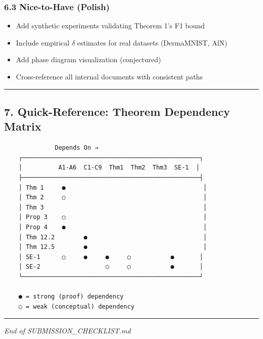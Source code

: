 \documentclass[
  12pt,
]{ctexart}
\providecommand{\tightlist}{%
  \setlength{\itemsep}{0pt}\setlength{\parskip}{0pt}}
\begin{document}
\subsubsection{6.3 Nice-to-Have (Polish)}\label{nice-to-have-polish}

\begin{itemize}
\tightlist
\item[$\square$]
  Add synthetic experiments validating Theorem 1's F1 bound
\item[$\square$]
  Include empirical \(\delta\) estimates for real datasets (DermaMNIST,
  AlN)
\item[$\square$]
  Add phase diagram visualization (conjectured)
\item[$\square$]
  Cross-reference all internal documents with consistent paths
\end{itemize}

\begin{center}\rule{0.5\linewidth}{0.5pt}\end{center}

\subsection{7. Quick-Reference: Theorem Dependency
Matrix}\label{quick-reference-theorem-dependency-matrix}

\begin{verbatim}
              Depends On →
    ┌─────────────────────────────────────────────────┐
    │          A1-A6  C1-C9  Thm1  Thm2  Thm3  SE-1  │
    ├─────────────────────────────────────────────────┤
    │ Thm 1     ●                                      │
    │ Thm 2     ○                                      │
    │ Thm 3                                            │
    │ Prop 3    ○                                      │
    │ Prop 4    ●                                      │
    │ Thm 12.2        ●                                │
    │ Thm 12.5        ●                                │
    │ SE-1      ○     ●     ●     ○           ●       │
    │ SE-2                  ○     ○           ●       │
    └─────────────────────────────────────────────────┘

    ● = strong (proof) dependency
    ○ = weak (conceptual) dependency
\end{verbatim}

\begin{center}\rule{0.5\linewidth}{0.5pt}\end{center}

\emph{End of SUBMISSION\_CHECKLIST.md}
\end{document}
